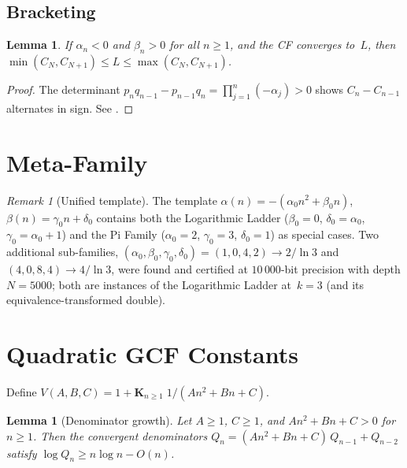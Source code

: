 \documentclass[11pt,a4paper]{article}
\theoremstyle{plain}
\newtheorem{lemma}[theorem]{Lemma}
\theoremstyle{definition}
\theoremstyle{remark}
\newtheorem{remark}[theorem]{Remark}
\begin{document}
\subsection{Bracketing}

\begin{lemma}\label{lem:bracket}
If $\alpha_n < 0$ and $\beta_n > 0$ for all $n \ge 1$, and the CF
converges to~$L$, then
$\min(C_N,C_{N+1}) \le L \le \max(C_N,C_{N+1})$.
\end{lemma}

\begin{proof}
The determinant $p_n q_{n-1} - p_{n-1} q_n
= \prod_{j=1}^n (-\alpha_j) > 0$
shows $C_n - C_{n-1}$ alternates in sign.
See \citet[Theorem~4.35]{lorentzen2008}.
\end{proof}

\section{Meta-Family}\label{sec:meta}

\begin{remark}[Unified template]
The template
$\alpha(n) = -(\alpha_0 n^2 + \beta_0 n)$,
$\beta(n) = \gamma_0 n + \delta_0$
contains both the Logarithmic Ladder
($\beta_0 = 0$, $\delta_0 = \alpha_0$, $\gamma_0 = \alpha_0 + 1$)
and the Pi Family
($\alpha_0 = 2$, $\gamma_0 = 3$, $\delta_0 = 1$)
as special cases.
Two additional sub-families,
$(\alpha_0, \beta_0, \gamma_0, \delta_0) = (1,0,4,2) \to 2/\ln 3$
and $(4,0,8,4) \to 4/\ln 3$,
were found and certified at $10\,000$-bit precision with depth $N = 5000$;
both are instances of the Logarithmic Ladder at~$k = 3$
(and its equivalence-transformed double).
\end{remark}

\section{Quadratic GCF Constants}\label{sec:vquad}

Define $V(A,B,C) = 1 + \mathbf{K}_{n \ge 1}\; 1/(An^2 + Bn + C)$.

\begin{lemma}[Denominator growth]\label{lem:Qgrowth}
Let $A \ge 1$, $C \ge 1$, and $An^2{+}Bn{+}C > 0$ for $n \ge 1$.
Then the convergent denominators
$Q_n = (An^2{+}Bn{+}C)\,Q_{n-1} + Q_{n-2}$
satisfy $\log Q_n \ge n\log n - O(n)$.
\end{lemma}
\end{document}

